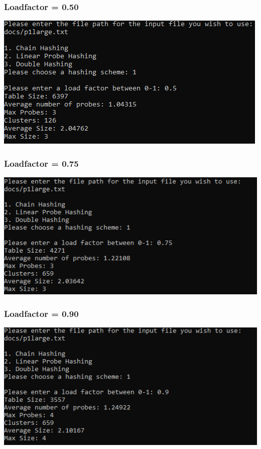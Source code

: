 \documentclass[titlepage]{article}
\begin{document}
\subsubsection{Loadfactor = 0.50}
\includegraphics[]{Large_Input/LF_0_50/ChainHash.png}
\subsubsection{Loadfactor = 0.75}
\includegraphics[]{Large_Input/LF_0_75/ChainHash.png}
\subsubsection{Loadfactor = 0.90}
\includegraphics[]{Large_Input/LF_0_90/ChainHash.png}
\end{document}
